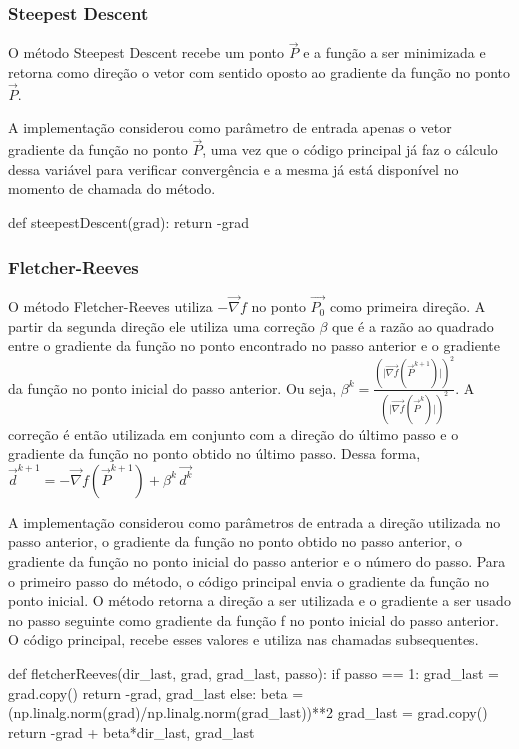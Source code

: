 \documentclass[10pt, a4paper]{article}
\begin{document}
\subsubsection{Steepest Descent}
O método Steepest Descent recebe um ponto $\overrightarrow{P}$ e a função a ser minimizada e retorna como direção o vetor com sentido oposto ao gradiente da função no ponto $\overrightarrow{P}$.

A implementação considerou como parâmetro de entrada apenas o vetor gradiente da função no ponto $\overrightarrow{P}$, uma vez que o código principal já faz o 
cálculo dessa variável para verificar convergência e a mesma já está disponível no momento de chamada do método.
\begin{python}
 def steepestDescent(grad):
    return -grad
\end{python}

\subsubsection{Fletcher-Reeves}
O método Fletcher-Reeves utiliza $-\overrightarrow{\nabla}f$ no ponto $\overrightarrow{P_0}$ como primeira direção. A partir da segunda direção
ele utiliza uma correção $\beta$ que é a razão ao quadrado entre o gradiente da função no ponto encontrado no passo anterior e o gradiente da função no ponto
inicial do passo anterior. Ou seja, $\beta^k = \frac{(\lvert\overrightarrow{\nabla f}(\overrightarrow{P}^{k+1})\rvert)^2}{(\lvert\overrightarrow{\nabla f}(\overrightarrow{P}^k)\rvert)^2}$.
A correção é então utilizada em conjunto com a direção do último passo e o gradiente da função no ponto obtido no último passo. Dessa forma,
$\overrightarrow{d}^{k+1} = -\overrightarrow{\nabla}f(\overrightarrow{P}^{k+1}) + \beta^k\,\overrightarrow{d^k}$

A implementação considerou como parâmetros de entrada a direção utilizada no passo anterior, o gradiente da função no ponto obtido no passo anterior, o gradiente 
da função no ponto inicial do passo anterior e o número do passo. Para o primeiro passo do método, o código principal envia o gradiente da função no ponto inicial.
O método retorna a direção a ser utilizada e o gradiente a ser usado no passo seguinte como gradiente da função f no ponto inicial do passo anterior. O código principal,
recebe esses valores e utiliza nas chamadas subsequentes.

\begin{python}
 def fletcherReeves(dir_last, grad, grad_last, passo):
    if passo == 1:
        grad_last = grad.copy()
        return -grad, grad_last
    else:
        beta = (np.linalg.norm(grad)/np.linalg.norm(grad_last))**2
        grad_last = grad.copy()
        return -grad + beta*dir_last, grad_last
\end{python}
\end{document}

